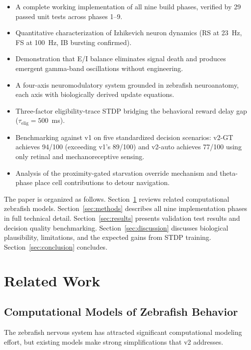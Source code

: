 \documentclass[11pt,a4paper]{article}
\begin{document}
\begin{itemize}[nosep,leftmargin=2em]
  \item A complete working implementation of all nine build phases,
    verified by 29 passed unit tests across phases 1--9.
  \item Quantitative characterization of Izhikevich neuron dynamics
    (RS at 23~Hz, FS at 100~Hz, IB bursting confirmed).
  \item Demonstration that E/I balance eliminates signal death and
    produces emergent gamma-band oscillations without engineering.
  \item A four-axis neuromodulatory system grounded in zebrafish
    neuroanatomy, each axis with biologically derived update equations.
  \item Three-factor eligibility-trace STDP bridging the behavioral
    reward delay gap ($\tau_\mathrm{elig} = 500$~ms).
  \item Benchmarking against v1 on five standardized decision scenarios:
    v2-GT achieves 94/100 (exceeding v1's 89/100) and v2-auto achieves
    77/100 using only retinal and mechanoreceptive sensing.
  \item Analysis of the proximity-gated starvation override mechanism
    and theta-phase place cell contributions to detour navigation.
\end{itemize}

The paper is organized as follows.
Section~\ref{sec:related} reviews related computational zebrafish models.
Section~\ref{sec:methods} describes all nine implementation phases in
full technical detail.
Section~\ref{sec:results} presents validation test results and decision
quality benchmarking.
Section~\ref{sec:discussion} discusses biological plausibility, limitations,
and the expected gains from STDP training.
Section~\ref{sec:conclusion} concludes.

\section{Related Work}\label{sec:related}

\subsection{Computational Models of Zebrafish Behavior}

The zebrafish nervous system has attracted significant computational
modeling effort, but existing models make strong simplifications that
v2 addresses.
\end{document}
